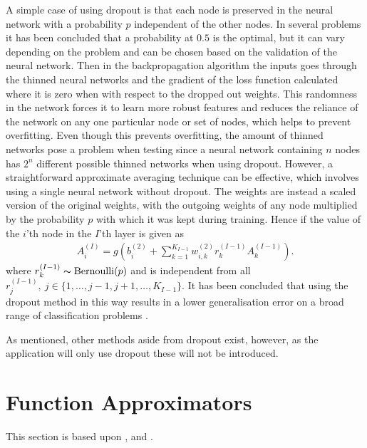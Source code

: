 A simple case of using dropout is that each node is preserved in the neural network with a probability $p$ independent of the other nodes. In several problems it has been concluded that a probability at $0.5$ is the optimal, but it can vary depending on the problem and can be chosen based on the validation of the neural network. Then in the backpropagation algorithm the inputs goes through the thinned neural networks and the gradient of the loss function calculated where it is zero when with respect to the dropped out weights. This randomness in the network forces it to learn more robust features and reduces the reliance of the network on any one particular node or set of nodes, which helps to prevent overfitting. Even though this prevents overfitting, the amount of thinned networks pose a problem when testing since a neural network containing $n$ nodes has $2^n$ different possible thinned networks when using dropout. However, a straightforward approximate averaging technique can be effective, which involves using a single neural network without dropout. The weights are instead a scaled version of the original weights, with the outgoing weights of any node multiplied by the probability $p$ with which it was kept during training. Hence if the value of the $i$'th node in the $I$'th layer is given as
\begin{align*}
    A^{(I)}_i = g\left(b_{i}^{(2)} + \sum_{k=1}^{K_{I-1}} w_{i,k}^{(2)}r_{k}^{(I-1)}A_{k}^{(I-1)}\right).
\end{align*}
where $r_{k}^{(I-1)} \thicksim \operatorname{Bernoulli}(p)$ and is independent from all $r_{j}^{(I-1)}, \ j\in \{1,\ldots, j-1,j+1, \ldots, K_{I-1}\}$. It has been concluded that using the dropout method in this way results in a lower generalisation error on a broad range of classification problems \citep{Dropout}.

As mentioned, other methods aside from dropout exist, however, as the application will only use dropout these will not be introduced.


\section{Function Approximators}\label{sec:UAT}
This section is based upon \citep[p. 16-17]{Art}, \citep{Barron} and \citep{REOS}.

